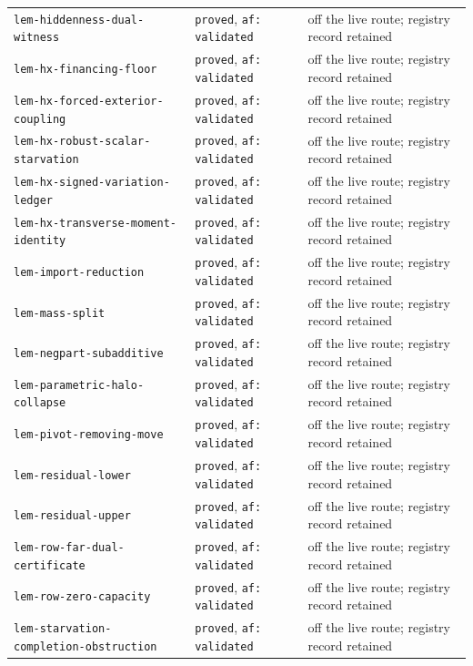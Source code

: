 \begin{longtable}{@{}p{}p{}p{}@{}}
\texttt{lem-hiddenness-dual-witness} & \texttt{proved}, \texttt{af: validated} & off the live route; registry record retained \\
\texttt{lem-hx-financing-floor} & \texttt{proved}, \texttt{af: validated} & off the live route; registry record retained \\
\texttt{lem-hx-forced-exterior-coupling} & \texttt{proved}, \texttt{af: validated} & off the live route; registry record retained \\
\texttt{lem-hx-robust-scalar-starvation} & \texttt{proved}, \texttt{af: validated} & off the live route; registry record retained \\
\texttt{lem-hx-signed-variation-ledger} & \texttt{proved}, \texttt{af: validated} & off the live route; registry record retained \\
\texttt{lem-hx-transverse-moment-identity} & \texttt{proved}, \texttt{af: validated} & off the live route; registry record retained \\
\texttt{lem-import-reduction} & \texttt{proved}, \texttt{af: validated} & off the live route; registry record retained \\
\texttt{lem-mass-split} & \texttt{proved}, \texttt{af: validated} & off the live route; registry record retained \\
\texttt{lem-negpart-subadditive} & \texttt{proved}, \texttt{af: validated} & off the live route; registry record retained \\
\texttt{lem-parametric-halo-collapse} & \texttt{proved}, \texttt{af: validated} & off the live route; registry record retained \\
\texttt{lem-pivot-removing-move} & \texttt{proved}, \texttt{af: validated} & off the live route; registry record retained \\
\texttt{lem-residual-lower} & \texttt{proved}, \texttt{af: validated} & off the live route; registry record retained \\
\texttt{lem-residual-upper} & \texttt{proved}, \texttt{af: validated} & off the live route; registry record retained \\
\texttt{lem-row-far-dual-certificate} & \texttt{proved}, \texttt{af: validated} & off the live route; registry record retained \\
\texttt{lem-row-zero-capacity} & \texttt{proved}, \texttt{af: validated} & off the live route; registry record retained \\
\texttt{lem-starvation-completion-obstruction} & \texttt{proved}, \texttt{af: validated} & off the live route; registry record retained \\

\end{longtable}
